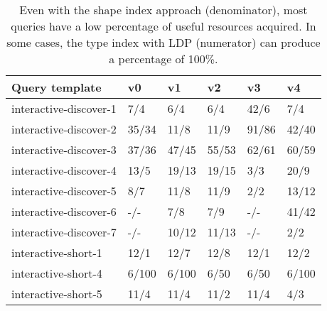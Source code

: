 \begin{table}
	\begin{center}
		\begin{tabular}{|l|l|l|l|l|l|}
			\hline
			Query template & v0 & v1 & v2 & v3 & v4 \\
			\hline
			interactive-discover-1 & 7/4 & 6/4 & 6/4 & 42/6 & 7/4 \\
			\hline
			interactive-discover-2 & 35/34 & 11/8 & 11/9 & 91/86 & 42/40 \\
			\hline
			interactive-discover-3 & 37/36 & 47/45 & 55/53 & 62/61 & 60/59 \\
			\hline
			interactive-discover-4 & 13/5 & 19/13 & 19/15 & 3/3 & 20/9 \\
			\hline
			interactive-discover-5 & 8/7 & 11/8 & 11/9 & 2/2 & 13/12 \\
			\hline
			interactive-discover-6 & -/- & 7/8 & 7/9 & -/- & 41/42 \\
			\hline
			interactive-discover-7 & -/- & 10/12 & 11/13 & -/- & 2/2 \\
			\hline
			interactive-short-1 & 12/1 & 12/7 & 12/8 & 12/1 & 12/2 \\
			\hline
			interactive-short-4 & 6/100 & 6/100 & 6/50 & 6/50 & 6/100 \\
			\hline
			interactive-short-5 & 11/4 & 11/4 & 11/2 & 11/4 & 4/3 \\
			\hline
		\end{tabular}
	\end{center}
	\caption{Even with the shape index approach (denominator), most queries have a low percentage of useful resources acquired. In some cases, the type index with LDP (numerator) can produce a percentage of 100\%.}
	\label{tab:ratioUsefulResources}
\end{table}